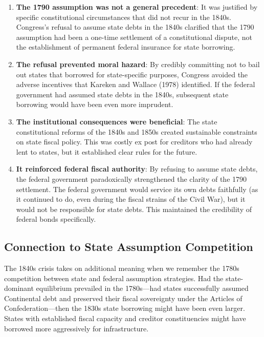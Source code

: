 \documentclass[12pt]{article}
\begin{document}
\begin{enumerate}
\item \textbf{The 1790 assumption was not a general precedent}: It was justified by specific constitutional circumstances that did not recur in the 1840s. Congress's refusal to assume state debts in the 1840s clarified that the 1790 assumption had been a one-time settlement of a constitutional dispute, not the establishment of permanent federal insurance for state borrowing.

\item \textbf{The refusal prevented moral hazard}: By credibly committing not to bail out states that borrowed for state-specific purposes, Congress avoided the adverse incentives that Kareken and Wallace (1978) identified. If the federal government had assumed state debts in the 1840s, subsequent state borrowing would have been even more imprudent.

\item \textbf{The institutional consequences were beneficial}: The state constitutional reforms of the 1840s and 1850s created sustainable constraints on state fiscal policy. This was costly ex post for creditors who had already lent to states, but it established clear rules for the future.

\item \textbf{It reinforced federal fiscal authority}: By refusing to assume state debts, the federal government paradoxically strengthened the clarity of the 1790 settlement. The federal government would service its own debts faithfully (as it continued to do, even during the fiscal strains of the Civil War), but it would not be responsible for state debts. This maintained the credibility of federal bonds specifically.
\end{enumerate}

\subsection{Connection to State Assumption Competition}

The 1840s crisis takes on additional meaning when we remember the 1780s competition between state and federal assumption strategies. Had the state-dominant equilibrium prevailed in the 1780s---had states successfully assumed Continental debt and preserved their fiscal sovereignty under the Articles of Confederation---then the 1830s state borrowing might have been even larger. States with established fiscal capacity and creditor constituencies might have borrowed more aggressively for infrastructure.
\end{document}
